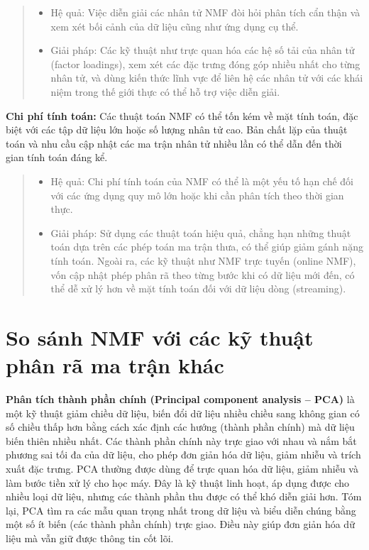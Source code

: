 \begin{quote}
\begin{itemize}
\item
  Hệ quả: Việc diễn giải các nhân tử NMF đòi hỏi phân tích cẩn thận và xem xét bối cảnh của dữ liệu cũng như ứng dụng cụ thể.
\item
  Giải pháp: Các kỹ thuật như trực quan hóa các hệ số tải của nhân tử (factor loadings), xem xét các đặc trưng đóng góp nhiều nhất cho từng nhân tử, và dùng kiến thức lĩnh vực để liên hệ các nhân tử với các khái niệm trong thế giới thực có thể hỗ trợ việc diễn giải.
\end{itemize}
\end{quote}

\textbf{Chi phí tính toán:} Các thuật toán NMF có thể tốn kém về mặt tính toán, đặc biệt với các tập dữ liệu lớn hoặc số lượng nhân tử cao. Bản chất lặp của thuật toán và nhu cầu cập nhật các ma trận nhân tử nhiều lần có thể dẫn đến thời gian tính toán đáng kể.

\begin{quote}
\begin{itemize}
\item
  Hệ quả: Chi phí tính toán của NMF có thể là một yếu tố hạn chế đối với các ứng dụng quy mô lớn hoặc khi cần phân tích theo thời gian thực.
\item
  Giải pháp: Sử dụng các thuật toán hiệu quả, chẳng hạn những thuật toán dựa trên các phép toán ma trận thưa, có thể giúp giảm gánh nặng tính toán. Ngoài ra, các kỹ thuật như NMF trực tuyến (online NMF), vốn cập nhật phép phân rã theo từng bước khi có dữ liệu mới đến, có thể dễ xử lý hơn về mặt tính toán đối với dữ liệu dòng (streaming).
\end{itemize}
\end{quote}

\section{So sánh NMF với các kỹ thuật phân rã ma trận khác}

\textbf{Phân tích thành phần chính (Principal component analysis -- PCA)} là một kỹ thuật giảm chiều dữ liệu, biến đổi dữ liệu nhiều chiều sang không gian có số chiều thấp hơn bằng cách xác định các hướng (thành phần chính) mà dữ liệu biến thiên nhiều nhất. Các thành phần chính này trực giao với nhau và nắm bắt phương sai tối đa của dữ liệu, cho phép đơn giản hóa dữ liệu, giảm nhiễu và trích xuất đặc trưng. PCA thường được dùng để trực quan hóa dữ liệu, giảm nhiễu và làm bước tiền xử lý cho học máy. Đây là kỹ thuật linh hoạt, áp dụng được cho nhiều loại dữ liệu, nhưng các thành phần thu được có thể khó diễn giải hơn. Tóm lại, PCA tìm ra các mẫu quan trọng nhất trong dữ liệu và biểu diễn chúng bằng một số ít biến (các thành phần chính) trực giao. Điều này giúp đơn giản hóa dữ liệu mà vẫn giữ được thông tin cốt lõi.

